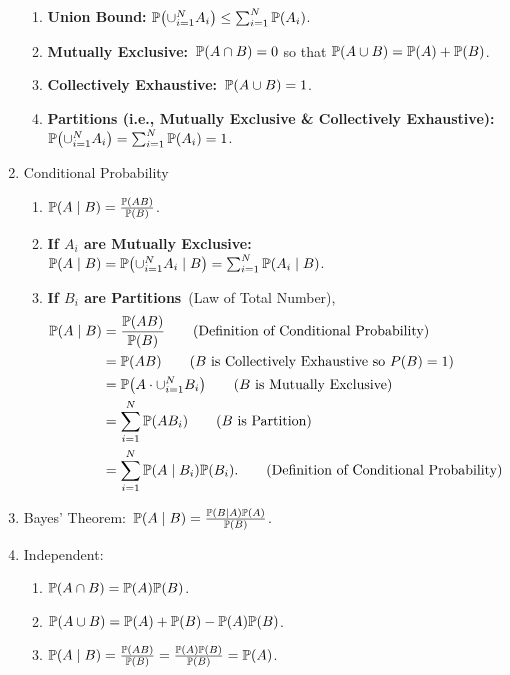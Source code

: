 \begin{enumerate}
\begin{enumerate}
        \item \textbf{Union Bound:} $\P{\cup_{i=1}^N A_i}\leq \sum_{i=1}^{N}\P{A_i}$.
        \item \textbf{Mutually Exclusive:}~$\P{A \cap B}=0$ so that $\P{A \cup B} = \P{A}+\P{B}$.
        \item \textbf{Collectively Exhaustive:}~$\P{A\cup B}=1$.
        \item \textbf{Partitions (i.e., Mutually Exclusive \& Collectively Exhaustive):}~$\P{\cup_{i=1}^N A_i}=\sum_{i=1}^{N}\P{A_i}=1$.
    \end{enumerate}
    \item Conditional Probability
    \begin{enumerate}
        \item $\condP{A}{B} = \frac{\P{AB}}{\P{B}}$.
        \item \textbf{If $A_i$ are Mutually Exclusive:}~$\condP{A}{B} = \condP{\cup_{i=1}^{N}A_i}{B} = \sum_{i=1}^{N}\condP{A_i}{B}$.
        \item \textbf{If $B_i$ are Partitions}~(Law of Total Number),
        \begin{align}
            \condP{A}{B}
            &= \frac{\P{AB}}{\P{B}}  \tag{Definition of Conditional Probability}\\
            &= \P{AB}  \tag{$B$ is Collectively Exhaustive so $P (B)=1$} \\
            &= \P{A\cdot\cup_{i=1}^{N}B_i}  \tag{$B$ is Mutually Exclusive} \\
            &= \sum_{i=1}^{N}\P{AB_i}  \tag{$B$ is Partition} \\
            &= \sum_{i=1}^{N}\condP{A}{B_i}\P{B_i}. \tag{Definition of Conditional Probability}
        \end{align}
    \end{enumerate}
    \item Bayes' Theorem:~$\condP{A}{B} = \frac{\condP{B}{A}\P{A}}{\P{B}}$.
    \item Independent:{
        \begin{enumerate}
            \item $\P{A\cap B}=\P{A}\P{B}$.
            \item $\P{A \cup B} = \P{A}+\P{B}-\P{A}\P{B}$.
            \item $\condP{A}{B} = \frac{\P{AB}}{\P{B}}=\frac{\P{A}\P{B}}{\P{B}}=\P{A}$.
        \end{enumerate}
    }
\end{enumerate}